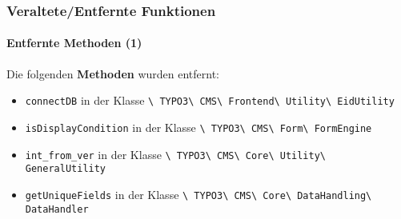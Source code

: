 
\begin{frame}[fragile]
	\frametitle{Veraltete/Entfernte Funktionen}
	\framesubtitle{Entfernte Methoden (1)}

	Die folgenden \textbf{Methoden} wurden entfernt:

	\begin{itemize}
		\item
			\small
				\texttt{connectDB}\newline
				in der Klasse
				\texttt{\textbackslash
					TYPO3\textbackslash
					CMS\textbackslash
					Frontend\textbackslash
					Utility\textbackslash
					EidUtility}
			\normalsize
		\item
			\small
				\texttt{isDisplayCondition}\newline
				in der Klasse
				\texttt{\textbackslash
					TYPO3\textbackslash
					CMS\textbackslash
					Form\textbackslash
					FormEngine}
			\normalsize
		\item
			\small
				\texttt{int\_from\_ver}\newline
				in der Klasse
				\texttt{\textbackslash
					TYPO3\textbackslash
					CMS\textbackslash
					Core\textbackslash
					Utility\textbackslash
					GeneralUtility}
			\normalsize
		\item
			\small
				\texttt{getUniqueFields}\newline
				in der Klasse
				\texttt{\textbackslash
					TYPO3\textbackslash
					CMS\textbackslash
					Core\textbackslash
					DataHandling\textbackslash
					DataHandler}
			\normalsize

	\end{itemize}

\end{frame}



